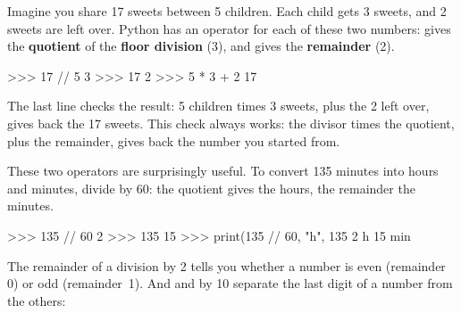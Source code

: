 
Imagine you share 17 sweets between 5 children. Each child gets 3 sweets, and 2 sweets are left over.
Python has an operator for each of these two numbers: \py{//} gives the \textbf{quotient} of the
\textbf{floor division} (3), and \py{\%} gives the \textbf{remainder} (2).

\begin{center}
\end{center}

\begin{console}
>>> 17 // 5
3
>>> 17 %
2
>>> 5 * 3 + 2
17
\end{console}

The last line checks the result: 5 children times 3 sweets, plus the 2 left over, gives back the 17
sweets. This check always works: the divisor times the quotient, plus the remainder, gives back
the number you started from.

These two operators are surprisingly useful. To convert 135 minutes into hours and minutes, divide
by 60: the quotient gives the hours, the remainder the minutes.

\begin{console}
>>> 135 // 60
2
>>> 135 %
15
>>> print(135 // 60, "h", 135 %
2 h 15 min
\end{console}

The remainder of a division by 2 tells you whether a number is even (remainder 0) or odd
(remainder~1). And \py{//} and \py{\%} by 10 separate the last digit of a number from the others:

